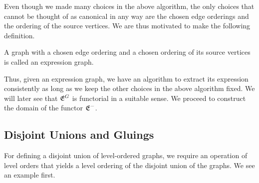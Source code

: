 \documentclass[./Thick_TQFTs_and_Quantum_Information.tex]{subfiles}
\begin{document}
Even though we made many choices in the above algorithm, the only
choices that cannot be thought of as canonical in any way are the chosen edge
orderings and the ordering of the source vertices. We are thus motivated to make
the following definition.

\begin{defn}
A graph with a chosen edge ordering and a chosen ordering of its source vertices
is called an expression graph.
\end{defn}

Thus, given an expression graph, we have an algorithm to extract its expression
consistently as long as we keep the other choices in the above algorithm fixed.
We will later see that $\mathfrak{E}^{G}$ is functorial in a suitable sense. We proceed
to construct the domain of the functor $\mathfrak{E}^{-}$.

\subsection{Disjoint Unions and Gluings}

For defining a disjoint union of level-ordered graphs, we require an operation
of level orders that yields a level ordering of the disjoint union of the
graphs. We see an example first.
\end{document}
